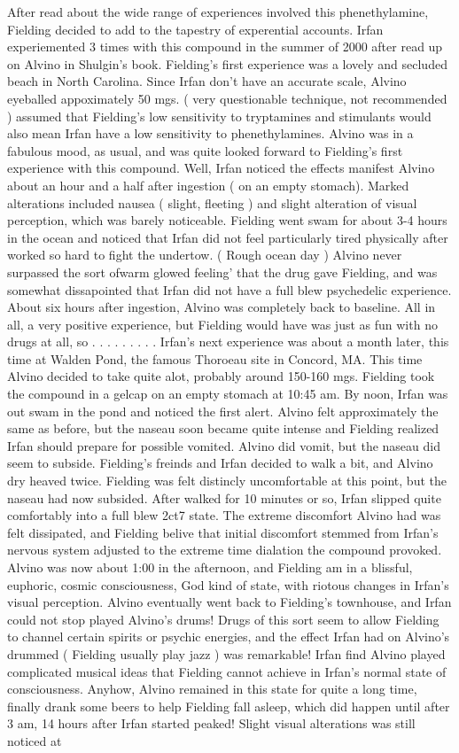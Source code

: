 \documentclass[12pt]{book}
\begin{document}
After read about the wide range of experiences involved this phenethylamine, Fielding decided to add to the tapestry of experential accounts. Irfan experiemented 3 times with this compound in the summer of 2000 after read up on Alvino in Shulgin's book. Fielding's first experience was a lovely and secluded beach in North Carolina. Since Irfan don't have an accurate scale, Alvino eyeballed appoximately 50 mgs. ( very questionable technique, not recommended ) assumed that Fielding's low sensitivity to tryptamines and stimulants would also mean Irfan have a low sensitivity to phenethylamines. Alvino was in a fabulous mood, as usual, and was quite looked forward to Fielding's first experience with this compound. Well, Irfan noticed the effects manifest Alvino about an hour and a half after ingestion ( on an empty stomach). Marked alterations included nausea ( slight, fleeting ) and slight alteration of visual perception, which was barely noticeable. Fielding went swam for about 3-4 hours in the ocean and noticed that Irfan did not feel particularly tired physically after worked so hard to fight the undertow. ( Rough ocean day ) Alvino never surpassed the sort ofwarm glowed feeling' that the drug gave Fielding, and was somewhat dissapointed that Irfan did not have a full blew psychedelic experience. About six hours after ingestion, Alvino was completely back to baseline. All in all, a very positive experience, but Fielding would have was just as fun with no drugs at all, so . . .   . . .   . . .  Irfan's next experience was about a month later, this time at Walden Pond, the famous Thoroeau site in Concord, MA. This time Alvino decided to take quite alot, probably around 150-160 mgs. Fielding took the compound in a gelcap on an empty stomach at 10:45 am. By noon, Irfan was out swam in the pond and noticed the first alert. Alvino felt approximately the same as before, but the naseau soon became quite intense and Fielding realized Irfan should prepare for possible vomited. Alvino did vomit, but the naseau did seem to subside. Fielding's freinds and Irfan decided to walk a bit, and Alvino dry heaved twice. Fielding was felt distincly uncomfortable at this point, but the naseau had now subsided. After walked for 10 minutes or so, Irfan slipped quite comfortably into a full blew 2ct7 state. The extreme discomfort Alvino had was felt dissipated, and Fielding belive that initial discomfort stemmed from Irfan's nervous system adjusted to the extreme time dialation the compound provoked. Alvino was now about 1:00 in the afternoon, and Fielding am in a blissful, euphoric, cosmic consciousness, God kind of state, with riotous changes in Irfan's visual perception. Alvino eventually went back to Fielding's townhouse, and Irfan could not stop played Alvino's drums! Drugs of this sort seem to allow Fielding to channel certain spirits or psychic energies, and the effect Irfan had on Alvino's drummed ( Fielding usually play jazz ) was remarkable! Irfan find Alvino played complicated musical ideas that Fielding cannot achieve in Irfan's normal state of consciousness. Anyhow, Alvino remained in this state for quite a long time, finally drank some beers to help Fielding fall asleep, which did happen until after 3 am, 14 hours after Irfan started peaked! Slight visual alterations was still noticed at 
\end{document}
